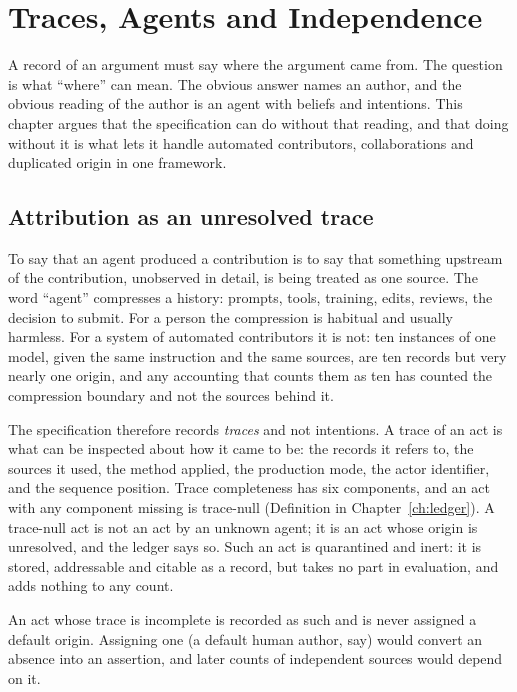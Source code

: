 \chapter{Traces, Agents and Independence}\label{ch:traces}

A record of an argument must say where the argument came from. The question is what ``where'' can mean. The obvious answer names an author, and the obvious reading of the author is an agent with beliefs and intentions. This chapter argues that the specification can do without that reading, and that doing without it is what lets it handle automated contributors, collaborations and duplicated origin in one framework.

\section{Attribution as an unresolved trace}\label{sec:attribution}

To say that an agent produced a contribution is to say that something upstream of the contribution, unobserved in detail, is being treated as one source. The word ``agent'' compresses a history: prompts, tools, training, edits, reviews, the decision to submit. For a person the compression is habitual and usually harmless. For a system of automated contributors it is not: ten instances of one model, given the same instruction and the same sources, are ten records but very nearly one origin, and any accounting that counts them as ten has counted the compression boundary and not the sources behind it.

The specification therefore records \emph{traces} and not intentions. A trace of an act is what can be inspected about how it came to be: the records it refers to, the sources it used, the method applied, the production mode, the actor identifier, and the sequence position. Trace completeness has six components, and an act with any component missing is trace-null (Definition in Chapter~\ref{ch:ledger}). A trace-null act is not an act by an unknown agent; it is an act whose origin is unresolved, and the ledger says so. Such an act is quarantined and inert: it is stored, addressable and citable as a record, but takes no part in evaluation, and adds nothing to any count.

\begin{designrule}\label{rule:tracenull}
An act whose trace is incomplete is recorded as such and is never assigned a default origin. Assigning one (a default human author, say) would convert an absence into an assertion, and later counts of independent sources would depend on it.
\end{designrule}

